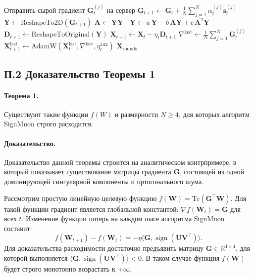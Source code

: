 \documentclass{article}
\begin{document}
\begin{algorithm}[H]
\begin{algorithmic}[1]
            \State Отправить сырой градиент $\mathbf{G}_t^{(j)}$ на сервер
        \EndFor
    \EndFor
    \State $\mathbf{G}_{t+1} \gets \mathbf{G}_t + \frac{1}{N} \sum_{j=1}^N \alpha_t^{(j)} \mathbf{s}_t^{(j)}$ 
        \State $\mathbf{Y} \gets \text{ReshapeTo2D}(\mathbf{G}_{t+1})$
            \State $\mathbf{A} \gets \mathbf{Y} \mathbf{Y}^\top$
            \State $\mathbf{Y} \gets a\,\mathbf{Y} - b\,\mathbf{A}\mathbf{Y} + c\,\mathbf{A}^2\mathbf{Y}$
        \EndFor
        \State $\mathbf{D}_{t+1} \gets \text{ReshapeToOriginal}(\mathbf{Y})$
        \State $\mathbf{X}_{t+1} \gets \mathbf{X}_t - \eta_t \mathbf{D}_{t+1}$ 
    \EndFor
    \State $\nabla^{\text{last}} \gets \frac{1}{N} \sum_{j=1}^N \mathbf{G}_t^{(j)}$
    \State $\mathbf{X}_{t+1}^{\text{last}} \gets \text{AdamW}(\mathbf{X}_t^{\text{last}}, \nabla^{\text{last}}, \eta_t^{\text{aux}})$ 
\EndFor
\State \Return $\mathbf{X}_{\mathrm{rounds}}$
\label{ef21_alg}
\end{algorithmic}
\end{algorithm}

\subsection*{П.2 Доказательство Теоремы 1}
\paragraph{Теорема 1.}\label{theorem_1} Существуют такие функции $f(W)$ и размерности $N \geq 4$, для которых алгоритм SignMuon строго расходится. 

\paragraph{Доказательство.} Доказательство данной теоремы строится на аналитическом контрпримере, в который показывает существование матрицы градиента $\mathbf{G}$, состоящей из одной доминирующей сингулярной компоненты и ортогонального шума.

Рассмотрим простую линейную целевую функцию $f(\mathbf{W}) = \mathrm{Tr}(\mathbf{G}^\top \mathbf{W})$. Для такой функции градиент является глобальной константой: $\nabla f(\mathbf{W}_t) = \mathbf{G}$ для всех $t$. Изменение функции потерь на каждом шаге алгоритма SignMuon составит:
\begin{equation}
f(\mathbf{W}_{t+1}) - f(\mathbf{W}_t) = -\eta \langle \mathbf{G}, \operatorname{sign}(\mathbf{U} \mathbf{V}^\top) \rangle.
\end{equation} 
Для доказательства расходимости достаточно предъявить матрицу $\mathbf{G} \in \mathbb{R}^{4 \times 4}$, для которой выполняется $\langle \mathbf{G}, \operatorname{sign}(\mathbf{U} \mathbf{V}^\top) \rangle < 0$. В таком случае функция $f(\mathbf{W})$ будет строго монотонно возрастать к $+\infty$.
\end{document}
